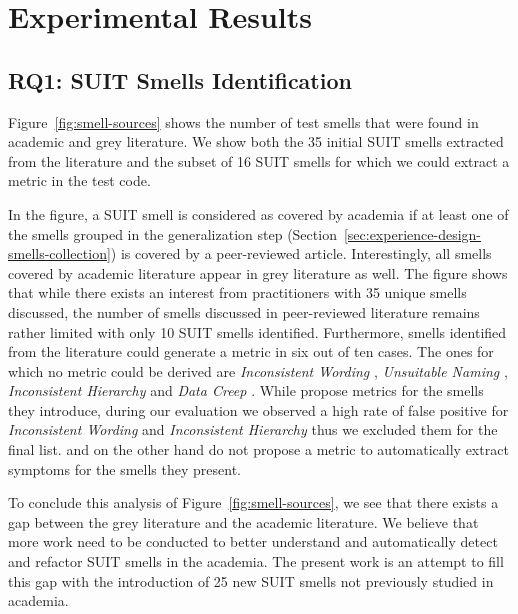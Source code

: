 \section{Experimental Results}
\label{sec:results}

\subsection{RQ1: SUIT Smells Identification}
\label{sec:results-smells-collection}

Figure~\ref{fig:smell-sources} shows the number of test smells that were found in academic and grey literature. We show both the 35 initial SUIT smells extracted from the literature and the subset of 16 SUIT smells for which we could extract a metric in the test code.

In the figure, a SUIT smell is considered as covered by academia if at least one of the smells grouped in the generalization step (Section~\ref{sec:experience-design-smells-collection}) is covered by a peer-reviewed article. Interestingly, all smells covered by academic literature appear in grey literature as well. The figure shows that while there exists an interest from practitioners with 35 unique smells discussed, the number of smells discussed in peer-reviewed literature remains rather limited with only 10 SUIT smells identified. Furthermore, smells identified from the literature could generate a metric in six out of ten cases. The ones for which no metric could be derived are \emph{Inconsistent Wording} \cite{Hauptmann2013}, \emph{Unsuitable Naming} \cite{Chen2012}, \emph{Inconsistent Hierarchy} \cite{Hauptmann2013} and \emph{Data Creep} \cite{Alegroth2016b}. While \cite{Hauptmann2013} propose metrics for the smells they introduce, during our evaluation we observed a high rate of false positive for \emph{Inconsistent Wording} and \emph{Inconsistent Hierarchy} thus we excluded them for the final list. \cite{Chen2012} and \cite{Alegroth2016b} on the other hand do not propose a metric to automatically extract symptoms for the smells they present. 

To conclude this analysis of Figure~\ref{fig:smell-sources}, we see that there exists a gap between the grey literature and the academic literature. We believe that more work need to be conducted to better understand and automatically detect and refactor SUIT smells in the academia. The present work is an attempt to fill this gap with the introduction of 25 new SUIT smells not previously studied in academia.

